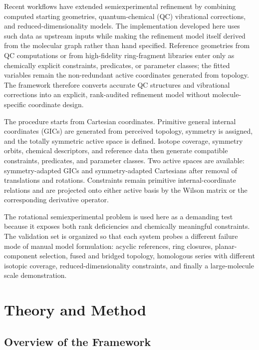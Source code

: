 \documentclass[aip,jcp,reprint,longbibliography,floatfix]{revtex4-2}
\begin{document}
Recent workflows have extended semiexperimental refinement by combining
computed starting geometries, quantum-chemical (QC) vibrational corrections, and
reduced-dimensionality models.\cite{Mendolicchio2025FastDvib} The implementation
developed here uses such data as upstream inputs while making the refinement
model itself derived from the molecular graph rather than hand specified.
Reference geometries from QC computations or from high-fidelity ring-fragment
libraries\cite{Lazzari2025LCB25} enter only as chemically explicit constraints,
predicates, or parameter classes; the fitted variables remain the
non-redundant active coordinates generated from topology. The framework
therefore converts accurate QC structures and vibrational corrections into an
explicit, rank-audited refinement model without molecule-specific coordinate
design.

The procedure starts from Cartesian coordinates. Primitive general internal
coordinates (GICs) are generated from perceived topology, symmetry is assigned,
and the totally symmetric active space is defined. Isotope coverage, symmetry
orbits, chemical descriptors, and reference data then generate compatible
constraints, predicates, and parameter classes. Two active spaces are available:
symmetry-adapted GICs and symmetry-adapted Cartesians after removal of
translations and rotations. Constraints remain primitive internal-coordinate
relations and are projected onto either active basis by the Wilson matrix or the
corresponding derivative operator.\cite{Wilson1955}

The rotational semiexperimental problem is used here as a demanding test
because it exposes both rank deficiencies and chemically meaningful
constraints. The validation set is organized so that each system probes a
different failure mode of manual model formulation: acyclic references, ring
closures, planar-component selection, fused and bridged topology, homologous
series with different isotopic coverage, reduced-dimensionality constraints,
and finally a large-molecule scale demonstration.


\section{Theory and Method}

\subsection{Overview of the Framework}
\end{document}
